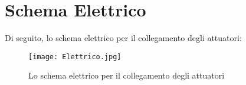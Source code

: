 \clearpage


\section{Schema Elettrico}
Di seguito, lo schema elettrico per il collegamento degli attuatori:

\begin{figure}[htbp]
\begin{center}
\texttt{[image: Elettrico.jpg]}
\caption{Lo schema elettrico per il collegamento degli attuatori}
\label{fig:schemelett}
\end{center}
\end{figure}
